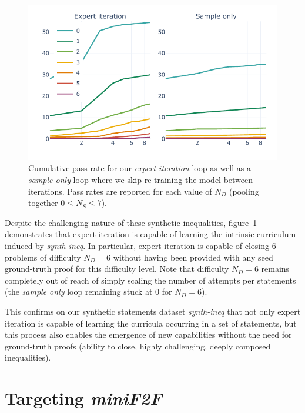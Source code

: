 \documentclass[nohyperref]{article}
\theoremstyle{plain}
\theoremstyle{definition}
\theoremstyle{remark}
\begin{document}
\begin{figure}[ht]
    \begin{center}
    \centerline{\includegraphics[width=\columnwidth]{figures/pp-ineq.pdf}}
    \caption{Cumulative pass rate for our \textit{expert iteration} loop as well as a \textit{sample only} loop where we skip re-training the model between iterations. Pass rates are reported for each value of $N_D$ (pooling together $0 \leq N_S \leq 7$).}
    \label{fig:pp-ineq}
    \end{center}
\end{figure}

Despite the challenging nature of these synthetic inequalities, figure~\ref{fig:pp-ineq} demonstrates that expert iteration is capable of learning the intrinsic curriculum induced by \textit{synth-ineq}. In particular, expert iteration is capable of closing $6$ problems of difficulty $N_D=6$ without having been provided with any seed ground-truth proof for this difficulty level. Note that difficulty $N_D=6$ remains completely out of reach of simply scaling the number of attempts per statements (the \textit{sample only} loop remaining stuck at $0$ for $N_D=6$).

This confirms on our synthetic statements dataset \textit{synth-ineq} that not only expert iteration is capable of learning the curricula occurring in a set of statements, but this process also enables the emergence of new capabilities without the need for ground-truth proofs (ability to close, highly challenging, deeply composed inequalities).

\section{Targeting \textit{miniF2F}}
\end{document}
